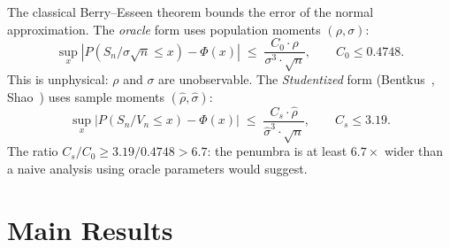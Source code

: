 \documentclass[11pt,a4paper]{article}
\theoremstyle{plain}
\theoremstyle{definition}
\renewcommand{\Phi}{\varPhi}
\begin{document}
The classical Berry--Esseen theorem bounds the error of the normal approximation.  The \emph{oracle} form uses population moments $(\rho, \sigma)$:
\[
  \sup_x |P(S_n / \sigma\sqrt{n} \leq x) - \Phi(x)| \;\leq\; \frac{C_0 \cdot \rho}{\sigma^3 \cdot \sqrt{n}}, \qquad C_0 \leq 0.4748.
\]
This is unphysical: $\rho$ and $\sigma$ are unobservable.  The \emph{Studentized} form (Bentkus~\cite{bentkus2003}, Shao~\cite{shao1999}) uses sample moments $(\hat\rho, \hat\sigma)$:
\[
  \sup_x |P(S_n / V_n \leq x) - \Phi(x)| \;\leq\; \frac{C_s \cdot \hat\rho}{\hat\sigma^3 \cdot \sqrt{n}}, \qquad C_s \leq 3.19.
\]
The ratio $C_s / C_0 \geq 3.19 / 0.4748 > 6.7$: the penumbra is at least $6.7\times$ wider than a naive analysis using oracle parameters would suggest.

\section{Main Results}\label{sec:main}
\end{document}
